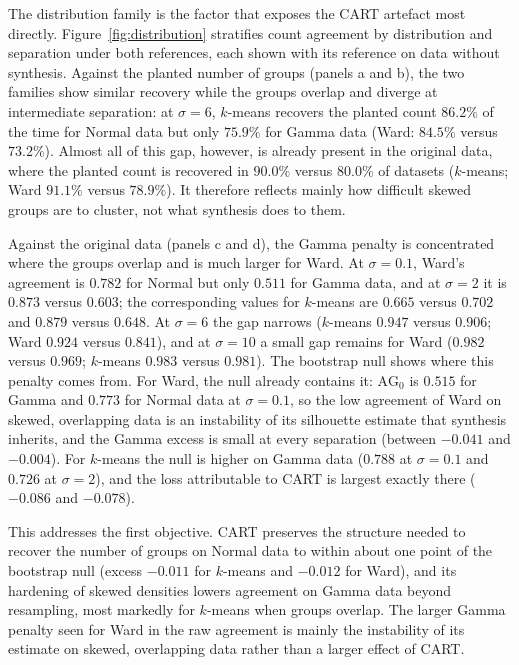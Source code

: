 \documentclass[pdflatex,referee]{sn-jnl}
\begin{document}
The distribution family is the factor that exposes the CART artefact most
directly. Figure~\ref{fig:distribution} stratifies count agreement by
distribution and separation under both references, each shown with its
reference on data without synthesis. Against the planted number of groups
(panels a and b), the two families show similar recovery while the groups
overlap and diverge at intermediate separation: at $\sigma = 6$, $k$-means
recovers the planted count $86.2\%$ of the time for Normal data but only
$75.9\%$ for Gamma data (Ward: $84.5\%$ versus $73.2\%$). Almost all of this
gap, however, is already present in the original data, where the planted
count is recovered in $90.0\%$ versus $80.0\%$ of datasets ($k$-means; Ward
$91.1\%$ versus $78.9\%$). It therefore reflects mainly how difficult skewed
groups are to cluster, not what synthesis does to them.

Against the original data (panels c and d), the Gamma penalty is concentrated
where the groups overlap and is much larger for Ward. At $\sigma = 0.1$,
Ward's agreement is $0.782$ for Normal but only $0.511$ for Gamma data, and at
$\sigma = 2$ it is $0.873$ versus $0.603$; the corresponding values for
$k$-means are $0.665$ versus $0.702$ and $0.879$ versus $0.648$. At
$\sigma = 6$ the gap narrows ($k$-means $0.947$ versus $0.906$; Ward $0.924$
versus $0.841$), and at $\sigma = 10$ a small gap remains for Ward ($0.982$
versus $0.969$; $k$-means $0.983$ versus $0.981$). The bootstrap null shows
where this penalty comes from. For Ward, the null already contains it:
$\mathrm{AG}_0$ is $0.515$ for Gamma and $0.773$ for Normal data at
$\sigma = 0.1$, so the low agreement of Ward on skewed, overlapping data is an
instability of its silhouette estimate that synthesis inherits, and the
Gamma excess is small at every separation (between $-0.041$ and $-0.004$). For
$k$-means the null is higher on Gamma data ($0.788$ at $\sigma = 0.1$ and
$0.726$ at $\sigma = 2$), and the loss attributable to CART is largest exactly
there ($-0.086$ and $-0.078$).

This addresses the first objective. CART preserves the structure needed to
recover the number of groups on Normal data to within about one point of the
bootstrap null (excess $-0.011$ for $k$-means and $-0.012$ for Ward), and its
hardening of skewed densities lowers agreement on Gamma data beyond
resampling, most markedly for $k$-means when groups overlap. The larger Gamma
penalty seen for Ward in the raw agreement is mainly the instability of its
estimate on skewed, overlapping data rather than a larger effect of CART.
\end{document}
